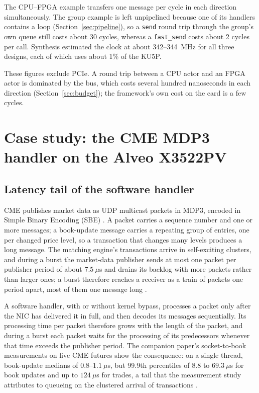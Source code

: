 \documentclass[11pt]{article}
\newcommand{\fs}{\texttt{fast\_send}}
\newcommand{\snd}{\texttt{send}}
\begin{document}
The CPU--FPGA example transfers one message per cycle in each direction
simultaneously. The group example is left unpipelined because one of its
handlers contains a loop (Section~\ref{sec:pipeline}), so a \snd{} round trip
through the group's own queue still costs about 30 cycles, whereas a \fs{}
costs about 2 cycles per call. Synthesis estimated the clock at about
342--344~MHz for all three designs, each of which uses about 1\% of the KU5P.

These figures exclude PCIe. A round trip between a CPU actor and an FPGA actor
is dominated by the bus, which costs several hundred nanoseconds in each
direction (Section~\ref{sec:budget}); the framework's own cost on the card is a
few cycles.

\section{Case study: the CME MDP3 handler on the Alveo X3522PV}
\label{sec:casestudy}

\subsection{Latency tail of the software handler}

CME publishes market data as UDP multicast packets in MDP3, encoded in Simple
Binary Encoding (SBE) \cite{fixsbe,cmemdp3}. A packet carries a sequence number
and one or more messages; a book-update message carries a repeating group of
entries, one per changed price level, so a transaction that changes many
levels produces a long message. The matching engine's transactions arrive in
self-exciting clusters, and during a burst the market-data publisher sends at
most one packet per publisher period of about $7.5~\mu$s and drains its backlog
with more packets rather than larger ones; a burst therefore reaches a receiver
as a train of packets one period apart, most of them one message long
\cite{mdarrival}.

A software handler, with or without kernel bypass, processes a packet only
after the NIC has delivered it in full, and then decodes its messages
sequentially. Its processing time per packet therefore grows with the length
of the packet, and during a burst each packet waits for the processing of its
predecessors whenever that time exceeds the publisher period. The companion
paper's socket-to-book measurements on live CME futures show the consequence:
on a single thread, book-update medians of $0.8$--$1.1~\mu$s, but 99.9th
percentiles of $8.8$ to $69.3~\mu$s for book updates and up to $124~\mu$s for
trades, a tail that the measurement study attributes to queueing on the
clustered arrival of transactions \cite{fastsend,mdarrival}.
\end{document}
